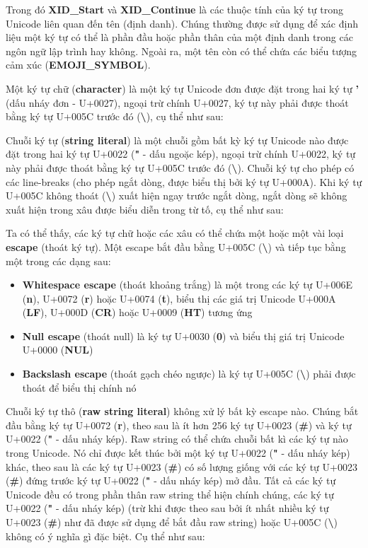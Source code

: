     \regexidentifier

\noindent Trong đó \textbf{XID\_Start} và \textbf{XID\_Continue} là các thuộc tính của ký tự trong Unicode liên quan đến tên (định danh). Chúng thường được sử dụng để xác định liệu một ký tự có thể là phần đầu hoặc phần thân của một định danh trong các ngôn ngữ lập trình hay không. Ngoài ra, một tên còn có thể chứa các biểu tượng cảm xúc (\textbf{EMOJI\_SYMBOL}).

Một ký tự chữ (\textbf{character}) là một ký tự Unicode đơn được đặt trong hai ký tự \textbf{'} (dấu nháy đơn - U+0027), ngoại trừ chính U+0027, ký tự này phải được thoát bằng ký tự U+005C trước đó (\textbf{\textbackslash}), cụ thể như sau:

    \regexcharliteral

    Chuỗi ký tự (\textbf{string literal}) là một chuỗi gồm bất kỳ ký tự Unicode nào được đặt trong hai ký tự U+0022 (\textbf{"} - dấu ngoặc kép), ngoại trừ chính U+0022, ký tự này phải được thoát bằng ký tự U+005C trước đó (\textbf{\textbackslash}). Chuỗi ký tự cho phép có các line-breaks (cho phép ngắt dòng, được biểu thị bởi ký tự U+000A). Khi ký tự U+005C không thoát (\textbf{\textbackslash}) xuất hiện ngay trước ngắt dòng, ngắt dòng sẽ không xuất hiện trong xâu được biểu diễn trong từ tố, cụ thể như sau:

    \regexstringliteral

    Ta có thể thấy, các ký tự chữ hoặc các xâu có thể chứa một hoặc một vài loại \textbf{escape} (thoát ký tự). Một escape bắt đầu bằng U+005C (\textbf{\textbackslash}) và tiếp tục bằng một trong các dạng sau:

    \begin{itemize}
    \item{\textbf{Whitespace escape} (thoát khoảng trắng) là một trong các ký tự U+006E (\textbf{n}), U+0072 (\textbf{r}) hoặc U+0074 (\textbf{t}), biểu thị các giá trị Unicode U+000A (\textbf{LF}), U+000D (\textbf{CR}) hoặc U+0009 (\textbf{HT}) tương ứng}
    \item{\textbf{Null escape} (thoát null) là ký tự U+0030 (\textbf{0}) và biểu thị giá trị Unicode U+0000 (\textbf{NUL})}
    \item{\textbf{Backslash escape} (thoát gạch chéo ngược) là ký tự U+005C (\textbf{\textbackslash}) phải được thoát để biểu thị chính nó}
    \end{itemize}

    Chuỗi ký tự thô (\textbf{raw string literal}) không xử lý bất kỳ escape nào. Chúng bắt đầu bằng ký tự U+0072 (\textbf{r}), theo sau là ít hơn 256 ký tự U+0023 (\textbf{\#}) và ký tự U+0022 (\textbf{"} - dấu nháy kép). Raw string có thể chứa chuỗi bất kì các ký tự nào trong Unicode. Nó chỉ được kết thúc bởi một ký tự U+0022 (\textbf{"} - dấu nháy kép) khác, theo sau là các ký tự U+0023 (\textbf{\#}) có số lượng giống với các ký tự U+0023 (\textbf{\#}) đứng trước ký tự U+0022 (\textbf{"} - dấu nháy kép) mở đầu. Tất cả các ký tự Unicode đều có trong phần thân raw string thể hiện chính chúng, các ký tự U+0022 (\textbf{"} - dấu nháy kép) (trừ khi được theo sau bởi ít nhất nhiều ký tự U+0023 (\textbf{\#}) như đã được sử dụng để bắt đầu raw string) hoặc U+005C (\textbf{\textbackslash}) không có ý nghĩa gì đặc biệt. Cụ thể như sau:

